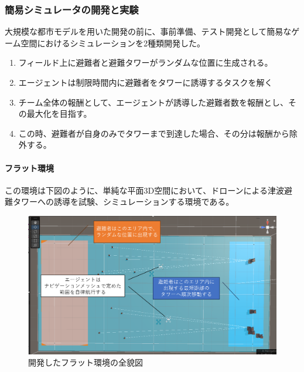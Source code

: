 \documentclass{article}[jsarticle]
\begin{document}
\subsubsection{簡易シミュレータの開発と実験}
大規模な都市モデルを用いた開発の前に、事前準備、テスト開発として簡易なゲーム空間におけるシミュレーションを2種類開発した。
\begin{enumerate}
    \item フィールド上に避難者と避難タワーがランダムな位置に生成される。
    \item エージェントは制限時間内に避難者をタワーに誘導するタスクを解く
    \item チーム全体の報酬として、エージェントが誘導した避難者数を報酬とし、その最大化を目指す。
    \item この時、避難者が自身のみでタワーまで到達した場合、その分は報酬から除外する。
\end{enumerate}

\paragraph{フラット環境}
この環境は下図のように、単純な平面3D空間において、ドローンによる津波避難タワーへの誘導を試験、シミュレーションする環境である。
\begin{figure}[H]
    \centering
    \includegraphics[scale=0.3]{./images/FIeld-3.png}
    \caption{
       開発したフラット環境の全貌図
    }
\end{figure}
\end{document}
